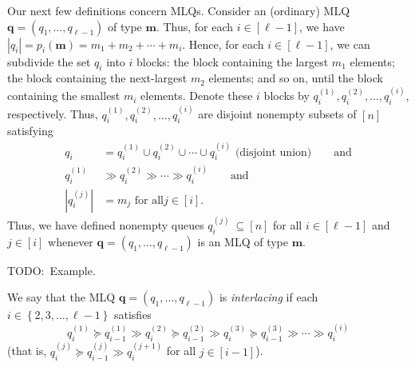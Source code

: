 \documentclass[reqno]{amsart}
\newcommand{\0}{\phantom{c}}
\newcommand{\defn}[1]{{\color{darkred}\emph{#1}}} %
\theoremstyle{plain}
\theoremstyle{definition}
\numberwithin{equation}{section}
\begin{document}
Our next few definitions concern MLQs. Consider an (ordinary) MLQ
$\mathbf{q}=\left(  q_{1},\ldots,q_{\ell-1}\right)  $ of type $\mathbf{m}$.
Thus, for each $i\in\left[  \ell-1\right]  $, we have $\left\vert
q_{i}\right\vert =p_{i}\left(  \mathbf{m}\right)  =m_{1}+m_{2}+\cdots+m_{i}$.
Hence, for each $i\in\left[  \ell-1\right]  $, we can subdivide the set
$q_{i}$ into $i$ blocks: the block containing the largest $m_{1}$ elements;
the block containing the next-largest $m_{2}$ elements; and so on, until the
block containing the smallest $m_{i}$ elements. Denote these $i$ blocks by
$q_{i}^{\left(  1\right)  },q_{i}^{\left(  2\right)  },\ldots,q_{i}^{\left(
i\right)  }$, respectively. Thus, $q_{i}^{\left(  1\right)  },q_{i}^{\left(
2\right)  },\ldots,q_{i}^{\left(  i\right)  }$ are disjoint nonempty subsets
of $\left[  n\right]  $ satisfying
\begin{align}
q_{i}  &  =q_{i}^{\left(  1\right)  }\cup q_{i}^{\left(  2\right)  }\cup
\cdots\cup q_{i}^{\left(  i\right)  }\text{ (disjoint union)}\qquad
\text{and}\label{eq.determinant_form.qij.1}\\
q_{i}^{\left(  1\right)  }  &  \gg q_{i}^{\left(  2\right)  }\gg\cdots\gg
q_{i}^{\left(  i\right)  }\qquad\text{and}\label{eq.determinant_form.qij.2}\\
\left\vert q_{i}^{\left(  j\right)  }\right\vert  &  =m_{j}\text{ for all
}j\in\left[  i\right]  . \label{eq.determinant_form.qij.3}%
\end{align}
Thus, we have defined nonempty queues
\defn{$q_{i}^{\left(j\right)}$}$\ \subseteq\left[  n\right]  $ for all
$i\in\left[  \ell-1\right]  $ and $j\in\left[  i\right]  $ whenever
$\mathbf{q}=\left(  q_{1},\ldots,q_{\ell-1}\right)  $ is an MLQ of type
$\mathbf{m}$.

TODO:\ Example.

We say that the MLQ $\mathbf{q}=\left(  q_{1},\ldots,q_{\ell-1}\right)  $ is
\defn{interlacing} if each $i\in\left\{  2,3,\ldots,\ell-1\right\}  $
satisfies%
\begin{equation}
q_{i}^{\left(  1\right)  }\succeq q_{i-1}^{\left(  1\right)  }\gg
q_{i}^{\left(  2\right)  }\succeq q_{i-1}^{\left(  2\right)  }\gg
q_{i}^{\left(  3\right)  }\succeq q_{i-1}^{\left(  3\right)  }\gg\cdots\gg
q_{i}^{\left(  i\right)  } \label{eq.determinant_form.interlacing.def}%
\end{equation}
(that is, $q_{i}^{\left(  j\right)  }\succeq q_{i-1}^{\left(  j\right)  }\gg
q_{i}^{\left(  j+1\right)  }$ for all $j\in\left[  i-1\right]  $).
\end{document}
